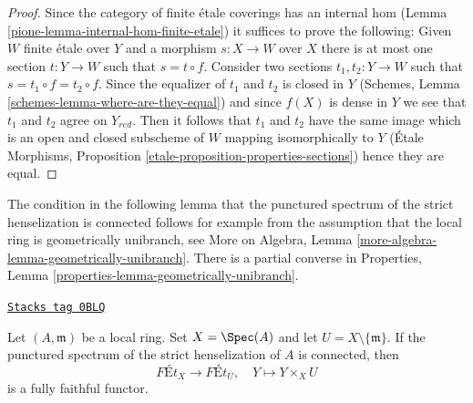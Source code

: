 \begin{proof}

Since the category of finite \'etale coverings has an
internal hom (Lemma \ref{pione-lemma-internal-hom-finite-etale})
it suffices to prove the following: Given $W$ finite \'etale over $Y$
and a morphism $s : X \to W$ over $X$ there is at most one section
$t : Y \to W$ such that $s = t \circ f$. Consider two sections
$t_1, t_2 : Y \to W$ such that $s = t_1 \circ f = t_2 \circ f$.
Since the equalizer of $t_1$ and $t_2$ is closed in $Y$
(Schemes, Lemma \ref{schemes-lemma-where-are-they-equal})
and since $f(X)$ is dense in $Y$ we see that $t_1$ and $t_2$
agree on $Y_{red}$. Then it follows that $t_1$ and $t_2$ have
the same image which is an open and closed subscheme of $W$ mapping
isomorphically to $Y$
(\'Etale Morphisms, Proposition \ref{etale-proposition-properties-sections})
hence they are equal.
\end{proof}

The condition in the following lemma that the punctured spectrum
of the strict henselization is connected follows for example from
the assumption that the local ring is geometrically unibranch, see
More on Algebra, Lemma \ref{more-algebra-lemma-geometrically-unibranch}.
There is a partial converse in
Properties, Lemma \ref{properties-lemma-geometrically-unibranch}.

\begin{lemma}
\label{pione-lemma-same-etale-extensions}
\href{https://stacks.math.columbia.edu/tag/0BLQ}{\texttt{Stacks tag 0BLQ}}

Let $(A, \mathfrak m)$ be a local ring. Set $X = \Spec(A)$
and let $U = X \setminus \{\mathfrak m\}$. If the punctured spectrum
of the strict henselization of $A$ is connected, then
$$
\textit{F\'Et}_X \longrightarrow \textit{F\'Et}_U,\quad
Y \longmapsto Y \times_X U
$$
is a fully faithful functor.
\end{lemma}

